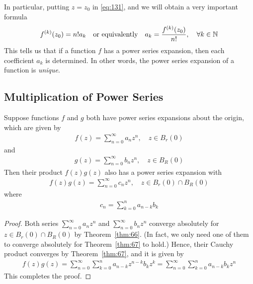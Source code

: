\documentclass[thmcnt=section, 12pt]{my-elegantbook}
\begin{document}
In particular, putting $z = z_0$ in \eqref{eq:131}, and we will obtain a very important formula 
\begin{align*}
    f^{(k)} (z_0) = n! a_k 
    \quad \text{or equivalently} \quad
    a_k = \frac{f^{(k)}(z_0)}{n!},
    \quad \forall k \in \mathbb{N}
\end{align*}
This tells us that if a function $f$ has a power series expansion, then each coefficient $a_k$ is determined. In other words, the power series expansion of a function is \textit{unique}. 


\subsection{Multiplication of Power Series}

\begin{theorem} \label{thm:69}
    Suppose functions $f$ and $g$ 
	both have power series expansions about the origin, 
	which are given by 
    \begin{align*}
        f(z) = \sum_{n=0}^\infty a_n z^n, 
        \quad z \in B_r(0)
    \end{align*}
    and 
    \begin{align*}
        g(z) = \sum_{n=0}^\infty b_n z^n, 
        \quad z \in B_R(0)
    \end{align*}
    Then their product $f(z)g(z)$ also has a power series expansion with 
    \begin{align*}
        f(z)g(z)
        = \sum_{n=0}^\infty c_n z^n,
        \quad z \in B_r(0) \cap B_R(0)
    \end{align*}
    where 
    \begin{align*}
        c_n = \sum_{k=0}^n a_{n-k} b_{k}
    \end{align*}
\end{theorem}

\begin{proof}
    Both series $\sum_{n=0}^\infty a_n z^n$ and $\sum_{n=0}^\infty b_n z^n$ converge absolutely for $z \in B_r(0) \cap B_R(0)$ by Theorem~\ref{thm:66}. (In fact, we only need one of them to converge absolutely for Theorem~\ref{thm:67} to hold.) Hence, their Cauchy product converges by Theorem~\ref{thm:67}, and it is given by 
    \begin{align*}
        f(z) g(z)
        = \sum_{n=0}^\infty \sum_{k=0}^n a_{n-k} z^{n-k} b_{k} z^k
        = \sum_{n=0}^\infty \sum_{k=0}^n a_{n-k} b_{k} z^n
    \end{align*}
    This completes the proof.
\end{proof}
\end{document}
